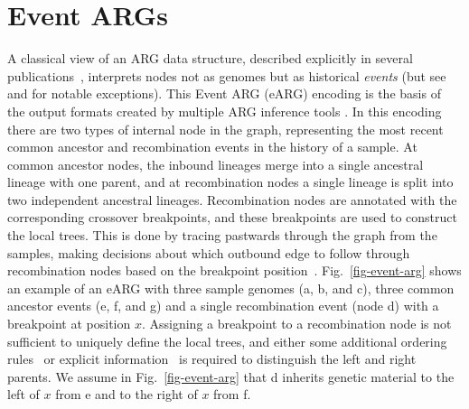 \documentclass[9pt,twocolumn,twoside]{gsajnl}
\newcommand{\noderef}[1]{\textsf{#1}}
\begin{document}
\section{Event ARGs}
\label{sec-eARG}
A classical view of an ARG data structure,
described explicitly in several publications~\citep[e.g.][]{
wiuf1999recombination,gusfield2014recombinatorics,hayman2023recoverability},
interprets nodes not as genomes but as historical \emph{events}
(but see~\citet{parida2011minimal} and \citet{zhang2023biobank}
for notable exceptions).
This Event ARG (eARG) encoding is the basis of the output formats 
created by multiple ARG inference tools
\citep[e.g.][]{song2004minimum,song2005efficient,rasmussen2014genome,
heine2018bridging,ignatieva2021kwarg}.
In this encoding there are two types of internal node in the graph,
representing the most recent common ancestor and recombination events
in the history of a sample.
At common ancestor nodes, the inbound lineages merge into a
single ancestral lineage with one parent, and at recombination
nodes a single lineage is split into two independent
ancestral lineages. Recombination nodes are annotated with
the corresponding crossover breakpoints, and these breakpoints
are used to construct the local trees.
This is done by tracing pastwards through the graph from the samples,
making decisions about which outbound edge to follow through
recombination nodes based on the breakpoint
position~\citep{griffiths1996ancestral}. Fig.~\ref{fig-event-arg} shows an example of an
eARG with three sample genomes (\noderef{a}, \noderef{b}, and \noderef{c}),
three common ancestor events (\noderef{e}, \noderef{f}, and \noderef{g})
and a single recombination event (node \noderef{d}) with a breakpoint
at position $x$.
Assigning a breakpoint to a recombination node is
not sufficient to uniquely define the local trees, and either
some additional ordering rules~\citep[e.g.][]{griffiths1996ancestral} or
explicit information~\citep[e.g.][]{gusfield2014recombinatorics,ignatieva2021kwarg}
is required to distinguish the left and right parents.
We assume in Fig.~\ref{fig-event-arg} that \noderef{d} inherits genetic material to the
left of $x$ from \noderef{e} and to the right of $x$ from \noderef{f}.
\end{document}
